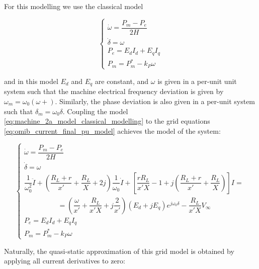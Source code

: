 	For this modelling we use the classical model

\begin{equation}
	\left\{\begin{array}{l}
		\dot{\omega} = \dfrac{P_m - P_e}{2H} \\[5mm]
		\dot{\delta} = \omega \\[5mm]
		P_e = E_dI_d + E_qI_q \\[5mm]
		P_m = P_m^* - k_P\omega
	\end{array}\right. \label{eq:machine_2a_model_classical_modelling}
\end{equation} %

	\noindent and in this model $E_d$ and $E_q$ are constant, and $\omega$ is given in a per-unit unit system such that the machine electrical frequency deviation is given by $\omega_m = \omega_0\left(\omega + \right)$. Similarly, the phase deviation is also given in a per-unit system such that $\delta_m = \omega_0\delta$. Coupling the model \eqref{eq:machine_2a_model_classical_modelling} to the grid equations \eqref{eq:omib_current_final_pu_model} achieves the model of the system:

\begin{equation}
	\left\{\begin{array}{l}
		\dot{\omega} = \dfrac{P_m - P_e}{2H} \\[5mm]
		\dot{\delta} = \omega \\[5mm]
		\dfrac{1}{\omega_0^2} \ddot{I} + \left(\dfrac{R_L + r}{x'} + \dfrac{R_L}{X} +  2j\right)\dfrac{1}{\omega_0}\dot{I} + \left[ \dfrac{rR_L}{x'X} - 1 + j\left(\dfrac{R_L + r}{x'}+ \dfrac{R_L}{X}\right) \right] I = \\[5mm]
%
		\hspace{2cm} = \left(\dfrac{\omega}{x'} + \dfrac{R_L}{x'X} + j\dfrac{2}{x'}\right)\left(E_d + jE_q\right)e^{j\omega_0\delta} - \dfrac{R_L}{x'X}V_\infty \\[5mm]
		P_e = E_dI_d + E_qI_q \\[5mm]
		P_m = P_m^* - k_P\omega
	\end{array}\right. \label{eq:omib_classical_total_model}
\end{equation} %

	Naturally, the quasi-static approximation of this grid model is obtained by applying all current derivatives to zero:

